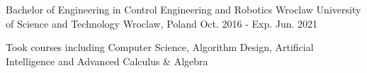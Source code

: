 
\begin{cventries}

  \cventry
    {Bachelor of Engineering in Control Engineering and Robotics} %
    {Wroclaw University of Science and Technology} %
    {Wroclaw, Poland} %
    {Oct. 2016 - Exp. Jun. 2021} %
    {
      \begin{cvitems} %
        \item {Took courses including Computer Science, Algorithm Design, Artificial Intelligence and Advanced Calculus \& Algebra}
      \end{cvitems}
    }

\end{cventries}
